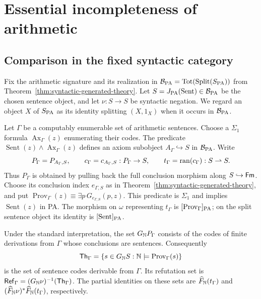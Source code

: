\section{Essential incompleteness of arithmetic}\label{sec:arithmetic}

\subsection{Comparison in the fixed syntactic category}
\label{subsec:arithmetic-internal-comparison}

Fix the arithmetic signature and its realization in
$\mathcal B_{\mathrm{PA}}=\operatorname{Tot}(\operatorname{Split}(S_{\mathrm{PA}}))$ from
Theorem~\ref{thm:syntactic-generated-theory}.
Let $S=J_{\mathrm{PA}}(\operatorname{Sent})\in\mathcal B_{\mathrm{PA}}$ be
the chosen sentence object, and let
$\nu:S\to S$ be syntactic negation.
We regard an object $X$ of $S_{\mathrm{PA}}$ as its identity splitting
$(X,1_X)$ when it occurs in $\mathcal B_{\mathrm{PA}}$.

Let $\Gamma$ be a computably enumerable set of arithmetic
sentences. Choose a $\Sigma_1$ formula
$\operatorname{Ax}_\Gamma(z)$ enumerating their codes.
The predicate
$\operatorname{Sent}(z)\land\operatorname{Ax}_\Gamma(z)$
defines an axiom subobject $A_\Gamma\hookrightarrow S$ in
$\mathcal B_{\mathrm{PA}}$. Write
\[
 P_\Gamma=P_{A_\Gamma,S},\qquad
 c_\Gamma=c_{A_\Gamma,S}:P_\Gamma\to S,\qquad
 t_\Gamma=\operatorname{ran}(c_\Gamma):S\rightharpoonup S.
\]
Thus $P_\Gamma$ is obtained by pulling back the full conclusion
morphism along $S\hookrightarrow\mathsf{Fm}$.
Choose its conclusion index $e_{\Gamma,S}$
as in Theorem~\ref{thm:syntactic-generated-theory}, and put
$\operatorname{Prov}_\Gamma(z)\equiv\exists p\,G_{e_{\Gamma,S}}(p,z)$.
This predicate is $\Sigma_1$ and implies
$\operatorname{Sent}(z)$ in PA. The morphism on $\omega$
representing $t_\Gamma$ is $[\operatorname{Prov}_\Gamma]_{\mathrm{PA}}$;
on the split sentence object its identity is
$[\operatorname{Sent}]_{\mathrm{PA}}$.

Under the standard interpretation, the set
$G_{\mathbb N}P_\Gamma$ consists of the codes of finite derivations from $\Gamma$
whose conclusions are sentences. Consequently
\[
 \mathsf{Th}_\Gamma
   =\{s\in G_{\mathbb N}S:\mathbb N\models\operatorname{Prov}_\Gamma(s)\}
\]
is the set of sentence codes derivable from $\Gamma$.
Its refutation set is
$\mathsf{Ref}_\Gamma=(G_{\mathbb N}\nu)^{-1}(\mathsf{Th}_\Gamma)$.
The partial identities on these sets are
$\widehat F_{\mathbb N}(t_\Gamma)$ and
$(\widehat F_{\mathbb N}\nu)^*\widehat F_{\mathbb N}(t_\Gamma)$,
respectively.

